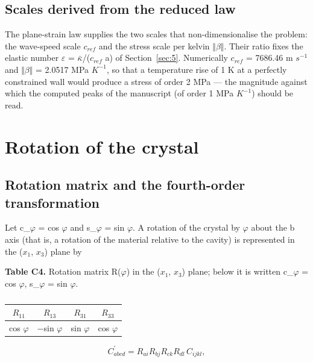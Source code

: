 \documentclass[preprint,12pt]{elsarticle}
\begin{document}
\subsection{Scales derived from the reduced law}
\label{sec:2.4}

The plane-strain law supplies the two scales that non-dimensionalise the problem: the wave-speed scale $c_{ref}$ and the stress scale per kelvin $\Vert \beta \Vert$. Their ratio fixes the elastic number $\varepsilon$ = $\bar{\kappa}$/($c_{ref}$ a) of Section~\ref{sec:5}. Numerically $c_{ref}$ = 7686.46 m $s^{-1}$ and $\Vert \beta \Vert$ = 2.0517 MPa $K^{-1}$, so that a temperature rise of 1 K at a perfectly constrained wall would produce a stress of order 2 MPa --- the magnitude against which the computed peaks of the manuscript (of order 1 MPa $K^{-1}$) should be read.

\section{Rotation of the crystal}
\label{sec:3}

\subsection{Rotation matrix and the fourth-order transformation}
\label{sec:3.1}

Let c\_$\varphi$ = cos $\varphi$ and s\_$\varphi$ = sin $\varphi$. A rotation of the crystal by $\varphi$ about the b axis (that is, a rotation of the material relative to the cavity) is represented in the ($x_{1}$, $x_{3}$) plane by

\textbf{Table C4.} Rotation matrix R($\varphi$) in the ($x_{1}$, $x_{3}$) plane; below it is written c\_$\varphi$ = cos $\varphi$, s\_$\varphi$ = sin $\varphi$.

\begin{table}[htbp]
\centering
\caption{}
\label{tab:?}
\begin{tabular}{cccc}
\toprule
$R_{11}$ & $R_{13}$ & $R_{31}$ & $R_{33}$ \\
\midrule
cos $\varphi$ & $-$sin $\varphi$ & sin $\varphi$ & cos $\varphi$ \\
\bottomrule
\end{tabular}
\end{table}

\begin{equation}
C^{\prime}_{abcd}=R_{ai}R_{bj}R_{ck}R_{dl}\,C_{ijkl}, 
\label{eq:4}
\end{equation}
\end{document}
